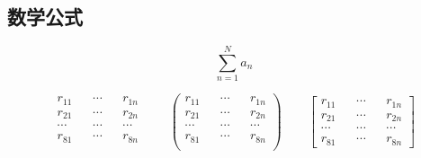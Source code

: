 \documentclass{cumcmthesis}
\begin{document}
\begin{appendices}
\section{数学公式}
\begin{equation}
    \sum\limits_{n=1}^Na_n
\end{equation}


\begin{equation}
    \begin{matrix} 
        r_{11}  &&    \cdots  &&  r_{1n}  \\
        r_{21}  &&  \cdots  &&  r_{2n}    \\ 
        \cdots  &&  \cdots  &&  \cdots    \\
        r_{81}  &&  \cdots  &&  r_{8n}    \\ 
    \end{matrix} 
    \quad\quad
    \begin{pmatrix} 
        r_{11}  &&  \cdots  &&  r_{1n}  \\
        r_{21}  &&  \cdots  &&  r_{2n}  \\ 
        \cdots  &&  \cdots  &&  \cdots  \\
        r_{81}  &&  \cdots  &&  r_{8n}  \\ 
    \end{pmatrix} 
    \quad\quad
    \begin{bmatrix} 
        r_{11}  &&  \cdots  &&  r_{1n}  \\
        r_{21}  &&  \cdots  &&  r_{2n}  \\ 
        \cdots  &&  \cdots  &&  \cdots  \\
        r_{81}  &&  \cdots  &&  r_{8n}  
    \end{bmatrix} 
\end{equation}


\end{appendices}
\end{document}
